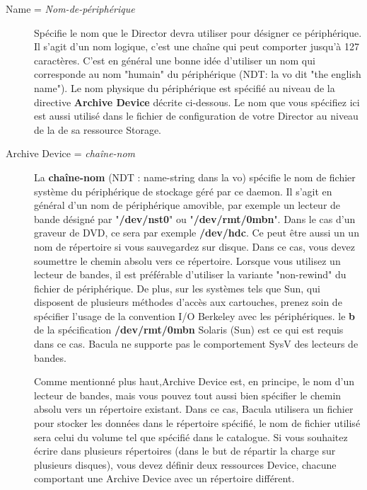 \begin{description}

\item [Name = {\it Nom-de-p\'eriph\'erique}]
   Sp\'ecifie le nom que le Director devra utiliser pour d\'esigner ce p\'eriph\'erique. 
   Il s'agit d'un nom logique, c'est une cha\^ine qui peut comporter jusqu'\`a 127 
   caract\`eres. C'est en g\'en\'eral une bonne id\'ee d'utiliser un nom qui corresponde 
   au nom "humain" du p\'eriph\'erique (NDT: la vo dit "the english name"). Le nom 
   physique du p\'eriph\'erique est sp\'ecifi\'e au niveau de la directive {\bf Archive Device} 
   d\'ecrite ci-dessous. Le nom que vous sp\'ecifiez ici est aussi utilis\'e dans le 
   fichier de configuration de votre Director au niveau de la 
    de sa ressource Storage.   

\item [Archive Device = {\it cha\^ine-nom}]
   La {\bf cha\^ine-nom} (NDT : name-string dans la vo) sp\'ecifie le nom de fichier syst\`eme 
   du p\'eriph\'erique de stockage g\'er\'e par ce daemon. Il s'agit en g\'en\'eral d'un nom 
   de p\'eriph\'erique amovible, par exemple un lecteur de bande d\'esign\'e par "{\bf /dev/nst0}" 
   ou "{\bf /dev/rmt/0mbn}". Dans le cas d'un graveur de DVD, ce sera par exemple 
   {\bf /dev/hdc}. Ce peut \^etre aussi un un nom de r\'epertoire si vous sauvegardez 
   sur disque. Dans ce cas, vous devez soumettre le chemin absolu vers ce 
   r\'epertoire. Lorsque vous utilisez un lecteur de bandes, il est pr\'ef\'erable 
   d'utiliser la variante "non-rewind" du fichier de p\'eriph\'erique. De plus, sur les 
   syst\`emes tels que Sun, qui disposent de plusieurs m\'ethodes d'acc\`es aux cartouches, 
   prenez soin de sp\'ecifier l'usage de la convention I/O Berkeley avec les p\'eriph\'eriques. 
   le {\bf b} de la sp\'ecification {\bf /dev/rmt/0mbn} Solaris (Sun) est ce qui est 
   requis dans ce cas. Bacula ne supporte pas le comportement SysV des lecteurs de bandes. 

   Comme mentionn\'e plus haut,Archive Device est, en principe, le nom d'un lecteur de bandes, 
   mais vous pouvez tout aussi bien sp\'ecifier le chemin absolu vers un r\'epertoire 
   existant. Dans ce cas, Bacula utilisera un fichier pour stocker les donn\'ees dans 
   le r\'epertoire sp\'ecifi\'e, le nom de fichier utilis\'e sera celui du volume tel que 
   sp\'ecifi\'e dans le catalogue. Si vous souhaitez \'ecrire dans plusieurs r\'epertoires 
   (dans le but de r\'epartir la charge sur plusieurs disques), vous devez d\'efinir deux ressources 
   Device, chacune comportant une Archive Device avec un r\'epertoire diff\'erent.
   

\end{description}
